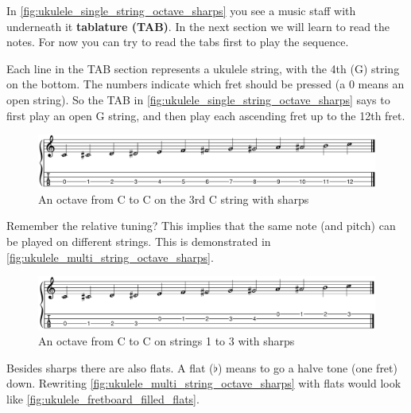 
In \autoref{fig:ukulele_single_string_octave_sharps} you see a music staff with underneath it \textbf{tablature (TAB)}. In the next section we will learn to read the notes. For now you can try to read the tabs first to play the sequence.

Each line in the TAB section represents a ukulele string, with the 4th (G) string on the bottom. The numbers indicate which fret should be pressed (a 0 means an open string). So the TAB in \autoref{fig:ukulele_single_string_octave_sharps} says to first play an open G string, and then play each ascending fret up to the 12th fret.

\begin{figure}[h]
    \centering
    \includegraphics[width=\textwidth]{../../MuseScore/Ukulele/UkuleleChromaticNotesSharpsSingleString.png}
    \caption{An octave from C to C on the 3rd C string with sharps}
    \label{fig:ukulele_single_string_octave_sharps}
\end{figure}

 Remember the relative tuning? This implies that the same note (and pitch) can be played on different strings. This is demonstrated in \autoref{fig:ukulele_multi_string_octave_sharps}.

\begin{figure}[h]
    \centering
    \includegraphics[width=\textwidth]{../../MuseScore/Ukulele/UkuleleChromaticNotesSharpsMultiString.png}
    \caption{An octave from C to C on strings 1 to 3 with sharps}
    \label{fig:ukulele_multi_string_octave_sharps}
\end{figure}

\newpage

Besides sharps there are also flats. A flat ($\flat$) means to go a halve tone (one fret) down. Rewriting \autoref{fig:ukulele_multi_string_octave_sharps} with flats would look like \autoref{fig:ukulele_fretboard_filled_flats}.

